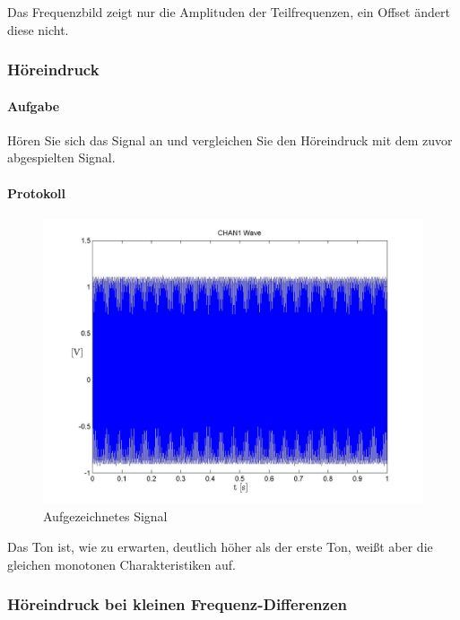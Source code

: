 \documentclass[10pt]{report}
\begin{document}
        Das Frequenzbild zeigt nur die Amplituden der Teilfrequenzen, ein Offset
        ändert diese nicht.

        \subsubsection{Höreindruck}
        \paragraph{Aufgabe}
        Hören Sie sich das Signal an und vergleichen Sie den Höreindruck mit dem zuvor
        abgespielten Signal.
        \paragraph{Protokoll}
        \begin{center}
            \begin{figure}[H]
                \includegraphics[width=\textwidth]{Screenshot_GUI_4132_chan1_wave.jpg}
              \caption{Aufgezeichnetes Signal}
            \end{figure}
        \end{center}

        Das Ton ist, wie zu erwarten, deutlich höher als der erste Ton, weißt aber
        die gleichen monotonen Charakteristiken auf.

        \subsubsection{Höreindruck bei kleinen Frequenz-Differenzen}
\end{document}
